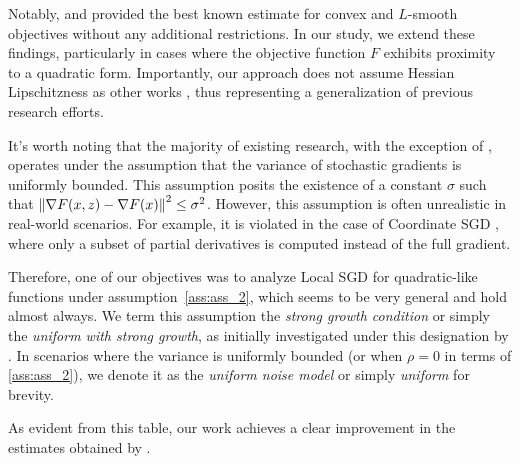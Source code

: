 \vspace{10pt}

Notably, \cite{Khaled} and \cite{Woodworth} provided the best known estimate for convex and $L$-smooth objectives without any additional restrictions. In our study, we extend these findings, particularly in cases where the objective function $F$ exhibits proximity to a quadratic form. Importantly, our approach does not assume Hessian Lipschitzness as other works \citep{FedAC}, thus representing a generalization of previous research efforts.

\vspace{10pt}

It's worth noting that the majority of existing research, with the exception of \cite{Spiridonoff}, operates under the assumption that the variance of stochastic gradients is uniformly bounded. This assumption posits the existence of a constant $\sigma$ such that $\left\|\nabla F(x, z) - \nabla F(x)\right\|^2 \leq \sigma^2$. However, this assumption is often unrealistic in real-world scenarios. For example, it is violated in the case of Coordinate SGD \citep{coordinateSGD}, where only a subset of partial derivatives is computed instead of the full gradient. 

\vspace{10pt}

Therefore, one of our objectives was to analyze Local SGD for quadratic-like functions under assumption~\ref{ass:ass_2}, which seems to be very general and hold almost always. We term this assumption the \textit{strong growth condition} or simply the \textit{uniform with strong growth}, as initially investigated under this designation by \cite{uniform_strong_growth}. In scenarios where the variance is uniformly bounded (or when $\rho = 0$ in terms of \ref{ass:ass_2}), we denote it as the \textit{uniform noise model} or simply \textit{uniform} for brevity.



As evident from this table, our work achieves a clear improvement in the estimates obtained by \cite{Khaled}.




